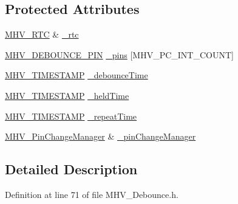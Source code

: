 \subsection*{Protected Attributes}
\begin{DoxyCompactItemize}
\item 
\hyperlink{class_m_h_v___r_t_c}{M\-H\-V\-\_\-\-R\-T\-C} \& \hyperlink{class_m_h_v___debounce_a5594f588099ccfcff2b3b23b503e8f6d}{\-\_\-rtc}
\item 
\hyperlink{_m_h_v___debounce_8h_a1e51966b7fb269bd10a163734aa1ddfb}{M\-H\-V\-\_\-\-D\-E\-B\-O\-U\-N\-C\-E\-\_\-\-P\-I\-N} \hyperlink{class_m_h_v___debounce_a5cf65bfecfc0efd4d51e1506972d2796}{\-\_\-pins} \mbox{[}M\-H\-V\-\_\-\-P\-C\-\_\-\-I\-N\-T\-\_\-\-C\-O\-U\-N\-T\mbox{]}
\item 
\hyperlink{_m_h_v___r_t_c_8h_a1e30d3a92b1b868286bd0d619245d8a6}{M\-H\-V\-\_\-\-T\-I\-M\-E\-S\-T\-A\-M\-P} \hyperlink{class_m_h_v___debounce_ac3d3f83d43cbb2c7b4b74244c75d593a}{\-\_\-debounce\-Time}
\item 
\hyperlink{_m_h_v___r_t_c_8h_a1e30d3a92b1b868286bd0d619245d8a6}{M\-H\-V\-\_\-\-T\-I\-M\-E\-S\-T\-A\-M\-P} \hyperlink{class_m_h_v___debounce_a051a7a07c755f52f4444075ff897ac82}{\-\_\-held\-Time}
\item 
\hyperlink{_m_h_v___r_t_c_8h_a1e30d3a92b1b868286bd0d619245d8a6}{M\-H\-V\-\_\-\-T\-I\-M\-E\-S\-T\-A\-M\-P} \hyperlink{class_m_h_v___debounce_a422167777e3bfcf6b7b46b992058950f}{\-\_\-repeat\-Time}
\item 
\hyperlink{class_m_h_v___pin_change_manager}{M\-H\-V\-\_\-\-Pin\-Change\-Manager} \& \hyperlink{class_m_h_v___debounce_a85d99fc351fbd791a4effe8bd8f76f6f}{\-\_\-pin\-Change\-Manager}
\end{DoxyCompactItemize}


\subsection{Detailed Description}


Definition at line 71 of file M\-H\-V\-\_\-\-Debounce.\-h.



